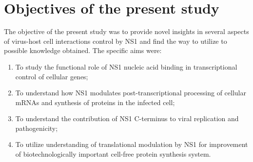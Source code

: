 \newpage
\section{Objectives of the present study}

The objective of the present study was to provide novel insights in several aspects of virus-host cell interactions control by NS1 and find the way to utilize to possible knowledge obtained. The specific aims were:

	\begin{enumerate}
		\item To study the functional role of NS1 nucleic acid binding in transcriptional control of cellular genes;
		
		\item To understand how NS1 modulates post-transcriptional processing of cellular mRNAs and synthesis of proteins in the infected cell;
		
		\item To understand the contribution of NS1 C-terminus to viral replication and pathogenicity;
		
		\item To utilize understanding of translational modulation by NS1 for improvement of biotechnologically important cell-free protein synthesis system.
		
	\end{enumerate}